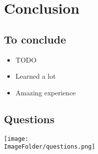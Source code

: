 %
%

\section{Conclusion}

\subsection{To conclude}
\begin{FrameWithSubSection}
    \begin{itemize}
        \item    TODO
        \item Learned a lot
        \item Amazing experience
    \end{itemize}
\end{FrameWithSubSection}

\subsection{Questions}
\begin{FrameWithSubSection}
    \center
  \texttt{[image: \\ImageFolder/questions.png]}
\end{FrameWithSubSection}
